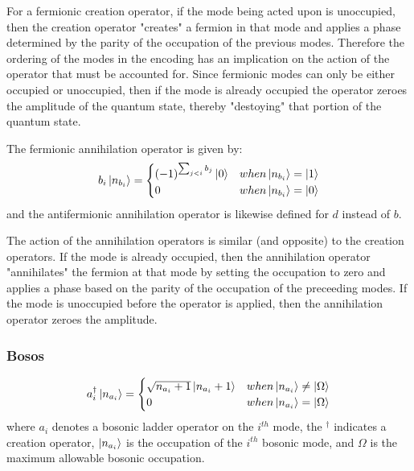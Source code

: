 For a fermionic creation operator, if the mode being acted upon is unoccupied, then the creation operator "creates" a fermion in that mode and applies a phase determined by the parity of the occupation of the previous modes.
Therefore the ordering of the modes in the encoding has an implication on the action of the operator that must be accounted for.
Since fermionic modes can only be either occupied or unoccupied, then if the mode is already occupied the operator zeroes the amplitude of the quantum state, thereby "destoying" that portion of the quantum state. 

The fermionic annihilation operator is given by:
\begin{equation}
    b_i \ket{n_{b_i}} = 
    \begin{cases} 
        (-1)^{\sum_{j < i} b_j} \ket{0}  & when \ket{n_{b_i}} = \ket{1} \\
        0 & when \ket{n_{b_i}} = \ket{0}
    \end{cases}
\end{equation}
and the antifermionic annihilation operator is likewise defined for $d$ instead of $b$.

The action of the annihilation operators is similar (and opposite) to the creation operators.
If the mode is already occupied, then the annihilation operator "annihilates" the fermion at that mode by setting the occupation to zero and applies a phase based on the parity of the occupation of the preceeding modes.
If the mode is unoccupied before the operator is applied, then the annihilation operator zeroes the amplitude.

\subsubsection{Bosos}

\begin{equation}
    \label{eq:bosonic-creation}
    a_i^\dagger \ket{n_{a_i}} = 
    \begin{cases} 
        \sqrt{n_{a_i} + 1} \ket{n_{a_i} + 1}  & when \ket{n_{a_i}} \neq \ket{\Omega} \\
        0 & when \ket{n_{a_i}} = \ket{\Omega}
    \end{cases}
\end{equation}
where $a_i$ denotes a bosonic ladder operator on the $i^{th}$ mode, the $^\dagger$ indicates a creation operator, $\ket{n_{a_i}}$ is the occupation of the $i^{th}$ bosonic mode, and $\Omega$ is the maximum allowable bosonic occupation.

